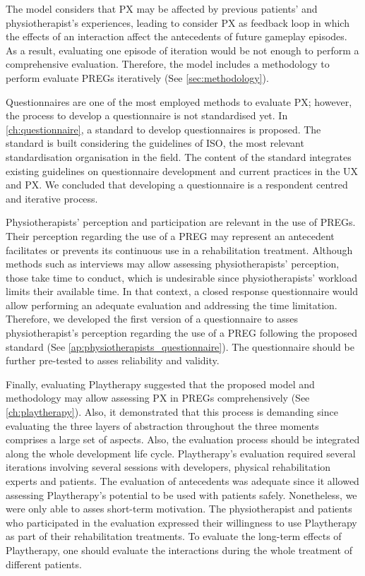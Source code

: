 The model considers that \ac{PX} may be affected by previous patients' and physiotherapist's experiences, leading to consider \ac{PX} as feedback loop in which the effects of an interaction affect the antecedents of future gameplay episodes. As a result, evaluating one episode of iteration would be not enough to perform a comprehensive evaluation. Therefore, the model includes a methodology to perform evaluate \acp{PREG} iteratively (See \autoref{sec:methodology}).

Questionnaires are one of the most employed methods to evaluate \ac{PX}; however, the process to develop a questionnaire is not standardised yet. In \autoref{ch:questionnaire}, a standard to develop questionnaires is proposed. The standard is built considering the guidelines of ISO, the most relevant standardisation organisation in the field. The content of the standard integrates existing guidelines on questionnaire development and current practices in the \ac{UX} and \ac{PX}. We concluded that developing a questionnaire is a respondent centred and iterative process.

Physiotherapists' perception and participation are relevant in the use of \acp{PREG}. Their perception regarding the use of a \ac{PREG} may represent an antecedent facilitates or prevents its continuous use in a rehabilitation treatment. Although methods such as interviews may allow assessing physiotherapists' perception, those take time to conduct, which is undesirable since physiotherapists' workload limits their available time. In that context, a closed response questionnaire would allow performing an adequate evaluation and addressing the time limitation. Therefore, we developed the first version of a questionnaire to asses physiotherapist's perception regarding the use of a \ac{PREG} following the proposed standard (See \autoref{ap:physiotherapists_questionnaire}). The questionnaire should be further pre-tested to asses reliability and validity.

Finally, evaluating Playtherapy suggested that the proposed model and methodology may allow assessing \ac{PX} in \acp{PREG} comprehensively (See \autoref{ch:playtherapy}). Also, it demonstrated that this process is demanding since evaluating the three layers of abstraction throughout the three moments comprises a large set of aspects. Also, the evaluation process should be integrated along the whole development life cycle. Playtherapy's evaluation required several iterations involving several sessions with developers, physical rehabilitation experts and patients. The evaluation of antecedents was adequate since it allowed assessing Playtherapy's potential to be used with patients safely. Nonetheless, we were only able to asses short-term motivation. The physiotherapist and patients who participated in the evaluation expressed their willingness to use Playtherapy as part of their rehabilitation treatments. To evaluate the long-term effects of  Playtherapy, one should evaluate the interactions during the whole treatment of different patients.


